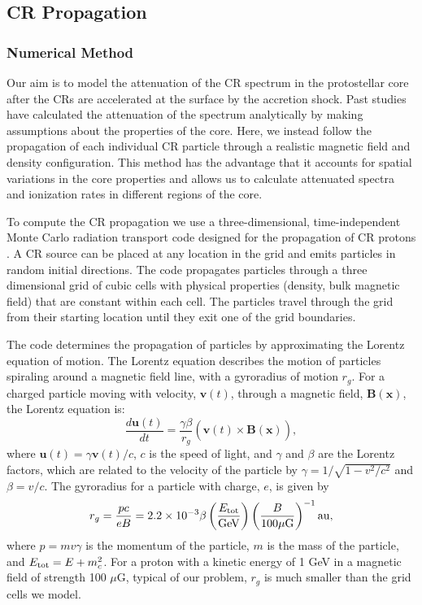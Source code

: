 \documentclass[twocolumn]{aastex63}
\def\lp{\left(}
\def\rp{\right)}
\begin{document}
\subsection{CR Propagation}
\label {subsection:propagation}

\subsubsection{Numerical Method}
\label{subsubsection:numerical}

Our aim is to model the attenuation of the CR spectrum in the protostellar core after the CRs are accelerated at the surface by the accretion shock. Past studies have calculated the attenuation of the spectrum analytically by making assumptions about the properties of the core. Here, we instead follow the propagation of each individual CR particle through a realistic magnetic field and density configuration. This method has the advantage that it accounts for spatial variations in the core properties and allows us to calculate attenuated spectra and ionization rates in different regions of the core. 

To compute the CR propagation we use a three-dimensional, time-independent Monte Carlo radiation transport code designed for the propagation of CR protons \citep{fitzaxen_2021_CRs}. A CR source can be placed at any location in the grid and emits particles in random initial directions. The code propagates particles through a three dimensional grid of cubic cells with physical properties (density, bulk magnetic field) that are constant within each cell. The particles travel through the grid from their starting location until they exit one of the grid boundaries.

The code determines the propagation of particles by approximating the Lorentz equation of motion. The Lorentz equation describes the motion of particles spiraling around a magnetic field line, with a gyroradius of motion $r_g$. For a charged particle moving with velocity, $\textbf{v}(t)$, through a magnetic field, $\textbf{B}(\textbf{x})$, the Lorentz equation is:
\begin{equation}
    \label{eq:Lorentz}
    \frac{d\textbf{u}(t)}{dt} =\frac{\gamma\beta}{r_g}(\textbf{v}(t)\times \hat{\textbf{B}}(\textbf{x})),
\end{equation}
where $\textbf{u}(t)=\gamma \textbf{v}(t)/c$, $c$ is the speed of light, and $\gamma$ and $\beta$ are the Lorentz factors, which are related to the velocity of the particle by $\gamma=1/\sqrt{1-v^2/c^2}$ and $\beta=v/c$. The gyroradius for a particle with charge, $e$, is given by
\begin{equation}
    r_g= \frac{p c}{e B} = 2.2 \times 10^{-3} \beta \lp\frac{E_{\rm tot}}{\rm GeV}\rp\lp\frac{B}{100 \mu \rm G}\rp^{-1} \rm au,
\end{equation}
where $p=mv\gamma$ is the momentum of the particle, $m$ is the mass of the particle, and $E_{\rm tot}=E+m_c^2$. For a proton with a kinetic energy of 1 GeV in a magnetic field of strength 100 $\mu$G, typical of our problem, $r_g$ is much smaller than the grid cells we model.
\end{document}
